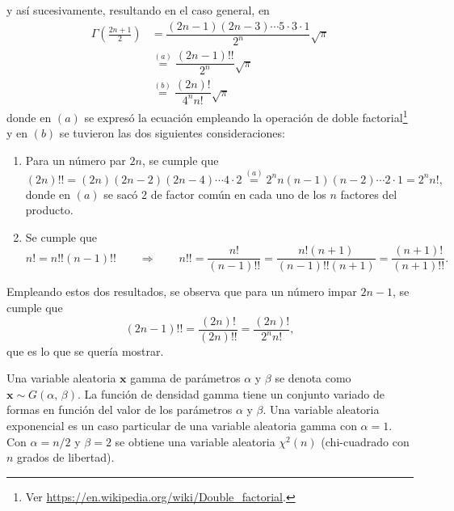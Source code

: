 \documentclass[a4paper]{report}
\newcommand{\x}{\mathbf{x}}
\begin{document}
y así sucesivamente, resultando en el caso general, en
\begin{align*}
 \Gamma\left(\frac{2n+1}{2}\right)&=\dfrac{(2n-1)(2n-3)\cdots5\cdot3\cdot1}{2^n}\sqrt{\pi}\\
 &\overset{(a)}{=}\dfrac{(2n-1)!!}{2^n}\sqrt{\pi}\\
 &\overset{(b)}{=}\dfrac{(2n)!}{4^nn!}\sqrt{\pi}
\end{align*}
donde en \((a)\) se expresó la ecuación empleando la operación de doble factorial\footnote{Ver \url{https://en.wikipedia.org/wiki/Double_factorial}.} y en \((b)\) se tuvieron las dos siguientes consideraciones:
\begin{enumerate}
 \item Para un número par \(2n\), se cumple que
  \[
   (2n)!!=(2n)(2n-2)(2n-4)\cdots4\cdot2\overset{(a)}{=}2^nn(n-1)(n-2)\cdots2\cdot1=2^nn!,
  \]
donde en \((a)\) se sacó 2 de factor común en cada uno de los \(n\) factores del producto.
 \item Se cumple que
 \[
 n!=n!!(n-1)!!\qquad\Rightarrow\qquad n!!=\frac{n!}{(n-1)!!}=\frac{n!(n+1)}{(n-1)!!(n+1)}=\frac{(n+1)!}{(n+1)!!}.
\]
\end{enumerate}
Empleando estos dos resultados, se observa que para un número impar \(2n-1\), se cumple que
\[
 (2n-1)!!=\frac{(2n)!}{(2n)!!}=\frac{(2n)!}{2^nn!},
\]
que es lo que se quería mostrar.

Una variable aleatoria \(\x\) gamma de parámetros \(\alpha\) y \(\beta\) se denota como \(\x\sim G(\alpha,\, \beta)\). La función de densidad gamma tiene un conjunto variado de formas en función del valor de los parámetros \(\alpha\) y \(\beta\). Una variable aleatoria exponencial es un caso particular de una variable aleatoria gamma con \(\alpha=1\). Con \(\alpha=n/2\) y \(\beta=2\) se obtiene una variable aleatoria \(\chi^2(n)\) (chi-cuadrado con \(n\) grados de libertad).
\end{document}
